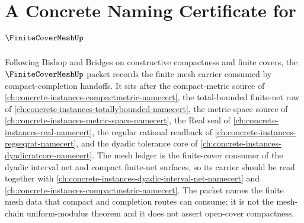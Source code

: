 \chapter{A Concrete Naming Certificate for $\FiniteCoverMeshUp$}
\label{ch:concrete-instances-finite-cover-mesh-namecert}

Following Bishop and Bridges on constructive compactness and finite covers, the $\FiniteCoverMeshUp$ packet records the finite mesh carrier consumed by compact-completion handoffs. It sits after the compact-metric source of \autoref{ch:concrete-instances-compactmetric-namecert}, the total-bounded finite-net row of \autoref{ch:concrete-instances-totallybounded-namecert}, the metric-space source of \autoref{ch:concrete-instances-metric-space-namecert}, the Real seal of \autoref{ch:concrete-instances-real-namecert}, the regular rational readback of \autoref{ch:concrete-instances-regseqrat-namecert}, and the dyadic tolerance core of \autoref{ch:concrete-instances-dyadicratcore-namecert}. The mesh ledger is the finite-cover consumer of the dyadic interval net and compact finite-net surfaces, so its carrier should be read together with \autoref{ch:concrete-instances-dyadic-interval-net-namecert} and \autoref{ch:concrete-instances-compactmetric-namecert}. The packet names the finite mesh data that compact and completion routes can consume; it is not the mesh-chain uniform-modulus theorem and it does not assert open-cover compactness.

